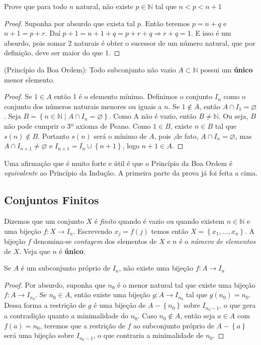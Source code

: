 \begin{prob}
Prove que para todo $n$ natural, não existe $p \in \mathbb{N}$ tal que $n < p < n+1$
\end{prob}
\begin{proof}
Suponha por absurdo que exista tal $p$. Então teremos $p=n+q$ e $n+1=p+r$. Daí $p+1=n+1+q=p+r+q\Rightarrow r+q=1$. E isso é um absurdo, pois somar 2 naturais é obter o sucessor de um número natural, que por definição, deve ser maior do que 1.
\end{proof}

\begin{theorem}
(Princípio da Boa Ordem): Todo subconjunto não vazio $A\subset \mathbb{N}$ possui um \textbf{único} menor elemento.
\end{theorem}

\begin{proof}
Se $1 \in A$ então 1 é o elemento mínimo. Definimos o conjunto $I_{n}$ como o conjunto dos números naturais menores ou iguais a $n$. Se $1\notin A$, então $A\cap I_{1}=\varnothing$. Seja $B=\left \{ n \in \mathbb{N} \mid A\cap I_{n}=\varnothing \right \}.$ Como A
não é vazio, então $B \neq \mathbb{N}$. Ou seja, $B$ não pode cumprir o 3º axioma de Peano. Como $1 \in B$, existe $n \in B$ tal que $s(n) \notin B$. Portanto $s(n)$ será o mínimo de $A$, pois ,de fato, $A\cap I_{n}=\varnothing$, mas $A\cap I_{n+1} \neq \varnothing $ e $ I_{n+1}= I_{n}\cup \left \{ n+1 \right \}$, logo $n+1 \in A$.
\end{proof}
Uma afirmação que é muito forte e útil é que o Princípio da Boa Ordem é \textit{equivalente} ao Princípio da Indução. A primeira parte da prova já foi feita a cima.


\subsection{Conjuntos Finitos}
Dizemos que um conjunto $X$ é \textit{finito} quando é vazio ou quando existem $n \in \mathbb{N}$ e uma bijeção $f:X\rightarrow I_{n}$. Escrevendo $x_{j}=f(j)$ temos então $X=\left \{ x_{1},...,x_{n} \right \}$. A bijeção $f$ denomina-se \textit{contagem} dos elementos de $X$ e $n$ é o \textit{número de elementos} de $X$. Veja que $n$ é \textbf{único}.

\begin{theorem}
Se $A$ é um subconjunto próprio de $I_{n}$, não existe uma bijeção $f:A\rightarrow I_{n}$
\end{theorem}
\begin{proof}
Por absurdo, suponha que $n_{0}$ é o menor natural tal que existe uma bijeção $f:A \rightarrow I_{n_{0}}$.  Se $n_{0} \in A$, então existe uma bijeção $g:A \rightarrow I_{n_{0}}$ tal que $g(n_{0})=n_{0}$. Dessa forma a restrição de $g$ é uma bijeção de $A-\left \{ n_{0} \right \}$ sobre $I_{n_{0}-1}$, o que gera a contradição quanto a minimalidade do $n_{0}$. Caso $n_{0} \notin A$, então seja $a \in A$ com $f(a)=n_{0}$, teremos que a restrição de $f$ ao subconjunto próprio de $A-\left \{a \right \}$ será uma bijeção sobre $I_{n_{0}-1}$, o que contraria a minimalidade de $n_{0}$. 
\end{proof}

